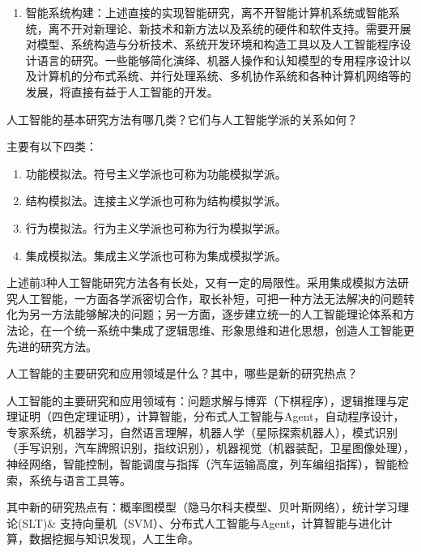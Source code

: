 \begin{solution}
\begin{enumerate}
		\item 智能系统构建：上述直接的实现智能研究，离不开智能计算机系统或智能系统，离不开对新理论、新技术和新方法以及系统的硬件和软件支持。需要开展对模型、系统构造与分析技术、系统开发环境和构造工具以及人工智能程序设计语言的研究。一些能够简化演绎、机器人操作和认知模型的专用程序设计以及计算机的分布式系统、并行处理系统、多机协作系统和各种计算机网络等的发展，将直接有益于人工智能的开发。\par
\end{enumerate} \par 		
\end{solution}

\begin{question}
人工智能的基本研究方法有哪几类？它们与人工智能学派的关系如何？
\end{question}
\begin{solution}
主要有以下四类：
	\begin{enumerate}
		\item 功能模拟法。符号主义学派也可称为功能模拟学派。
		\item 结构模拟法。连接主义学派也可称为结构模拟学派。
		\item 行为模拟法。行为主义学派也可称为行为模拟学派。
		\item 集成模拟法。集成主义学派也可称为集成模拟学派。
	\end{enumerate}\par
	上述前3种人工智能研究方法各有长处，又有一定的局限性。采用集成模拟方法研究人工智能，一方面各学派密切合作，取长补短，可把一种方法无法解决的问题转化为另一方法能够解决的问题；另一方面，逐步建立统一的人工智能理论体系和方法论，在一个统一系统中集成了逻辑思维、形象思维和进化思想，创造人工智能更先进的研究方法。
\end{solution}

\begin{question}
人工智能的主要研究和应用领域是什么？其中，哪些是新的研究热点？
\end{question}
\begin{solution}
人工智能的主要研究和应用领域有：问题求解与博弈（下棋程序），逻辑推理与定理证明（四色定理证明），计算智能，分布式人工智能与Agent，自动程序设计，专家系统，机器学习，自然语言理解，机器人学（星际探索机器人），模式识别（手写识别，汽车牌照识别，指纹识别），机器视觉（机器装配，卫星图像处理），神经网络，智能控制，智能调度与指挥（汽车运输高度，列车编组指挥），智能检索，系统与语言工具等。 \par
其中新的研究热点有：概率图模型（隐马尔科夫模型、贝叶斯网络），统计学习理论(SLT)\& 支持向量机（SVM）、分布式人工智能与Agent，计算智能与进化计算，数据挖掘与知识发现，人工生命。
\end{solution}